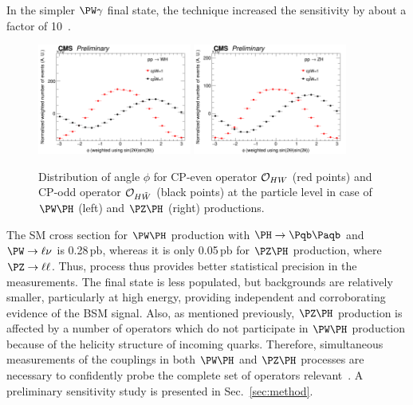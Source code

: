 \documentclass[a4paper,11pt]{article}
\newcommand{\Pb}{{{\Pqb}}\xspace}
\newcommand{\PAb}{{{{\Paqb}}}\xspace}
\newcommand{\pb} {\mbox{\ensuremath{\,\text{pb}}}\xspace}
\begin{document}
In the simpler $\PW\gamma$ final state, the technique increased the sensitivity by about a factor of 10~\cite{CMS-PAS-SMP-20-005}.
\begin{figure}[hbtp]
\begin{center}
\includegraphics[width=0.45\textwidth]{Figures/LHE/WH/LHE_Plot_phi.png}
\includegraphics[width=0.45\textwidth]{Figures/LHE/ZH/LHE_Plot_phi.png}
\end{center}
\caption{
Distribution of angle $\phi$ for CP-even operator ${\cal O}_{HW}$  (red points) and CP-odd operator ${\cal O}_{H\tilde{W}}$ (black points) at the particle level in case of $\PW\PH$ (left) and $\PZ\PH$ (right) productions.
}
\label{fig:LHE_phi}
\end{figure}

The SM cross section for $\PW\PH$ production with  $\PH\rightarrow\Pb\PAb$ and $\PW\rightarrow\ell\nu$  is 0.28\pb, whereas it is only 0.05\pb for $\PZ\PH$ production, where $\PZ\rightarrow\ell\ell$.
Thus, \PW process thus provides better statistical precision in the measurements. 
The \PZ final state is less populated, but backgrounds are relatively smaller, particularly at high energy, providing independent and corroborating evidence of the BSM signal.
Also, as mentioned previously, $\PZ\PH$ production is affected by a number of operators which do not participate in $\PW\PH$ production because of the helicity structure of incoming quarks.
Therefore, simultaneous measurements of the couplings in both $\PW\PH$ and $\PZ\PH$ processes are necessary to confidently probe the complete set of operators relevant~\cite{Banerjee:2019twi}.
A preliminary sensitivity study is presented in Sec.~\ref{sec:method}. 
\end{document}
